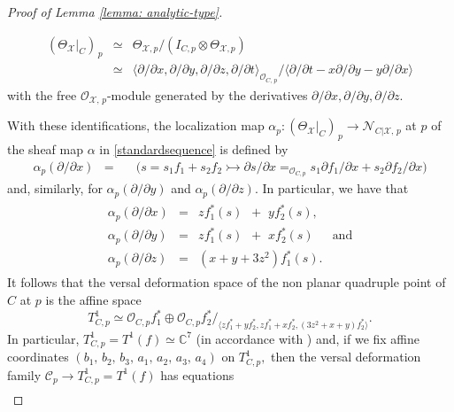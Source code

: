 \documentclass[plain]{amsart}
\begin{document}
\begin{proof}[Proof of Lemma \ref{lemma: analytic-type}]
\begin{itemize}
 \begin{eqnarray*}
 (\Theta_{\mathcal X}|_C)_{\, p}&\simeq &\Theta_{\mathcal X,p}/(I_{C,p}\otimes\Theta_{\mathcal X,p})\\
& \simeq & \langle \partial /{\partial x},\partial /{\partial y},\partial / {\partial z},\partial /{\partial t} \rangle
 _{\mathcal O_{C,\,p}}/
 \langle {\partial}/{\partial t}-x\partial /{\partial y}-y\partial /{\partial x}\rangle
 \end{eqnarray*}
 with the free $\mathcal O_{\mathcal X,\,p}$-module generated by the derivatives 
 $\partial /{\partial x},\partial / {\partial y},\partial /{\partial z}.$ 
 \end{itemize}
With these identifications, 
the localization map $\alpha_p:(\Theta_{\mathcal X}|_C)_{\, p}\rightarrow \mathcal N_{C|\mathcal X,\,p}$
at $p$ 
of the sheaf map $\alpha$ in \eqref{standardsequence}  is defined by
 \begin{eqnarray*}
\alpha_p(\partial /{\partial x})&=&\,\,\,\,\,\,\Big(s=s_1f_1+s_2f_2\rightarrowtail 
\partial s/\partial x=_{\mathcal O_{C,p}}
s_1\partial f_1 /{\partial x}
+s_2\partial f_2 /{\partial x}\Big)
\end{eqnarray*}
and, similarly, for $\alpha_p(\partial /{\partial y})$ and $\alpha_p(\partial /{\partial z}).$
In particular, we have that
 \begin{eqnarray}\label{components}
 \begin{array}{cccc}
\alpha_p(\partial /{\partial x})&=& zf_1^*(s)\,\,\,+\,\,yf_2^*(s),&\\
\alpha_p(\partial /{\partial y})&=& zf^*_1(s)\,\,\,+\,\,xf^*_2(s)\,&\textrm{and}\\
\alpha_p(\partial /{\partial z})&=& (x+y+3z^{2})f^*_1(s).&
\end{array}
\end{eqnarray}
It follows that the versal deformation space of the non planar quadruple point of $C$ at $p$ is the 
affine space
\begin{equation}
T^1_{C,p}\simeq\mathcal O_{C,p}f_1^*\oplus \mathcal O_{C,p}f_2^*/_{\langle zf_1^*+yf_2^*,
zf_1^*+xf_2^*,(3z^2+x+y)f_2^*\rangle}.
\end{equation}
In particular, $T^1_{C,p}=T^1(f)\simeq\mathbb C^7$
(in accordance with \cite[Proposition on p. 165]{giusti1}) 
and, if we fix affine coordinates 
$(b_1,\,b_2,\,b_3,\,a_1,\,a_2,\,a_3,\,a_4)$ on $T^1_{C,p},$ then
the versal deformation family $\mathcal C_p\to T^1_{C,p}=T^1(f)$ has equations
\begin{eqnarray}\label{versal_family}

\end{eqnarray}
\end{proof}
\end{document}
